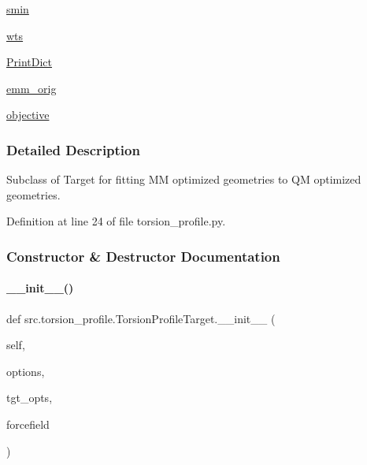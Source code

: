 \begin{DoxyCompactItemize}
\hyperlink{classsrc_1_1torsion__profile_1_1TorsionProfileTarget_a68645067dfaf9262844abe68c4ecacb6}{smin}
\item 
\hyperlink{classsrc_1_1torsion__profile_1_1TorsionProfileTarget_a712ce3fdf7f20114d54f59d79d97ede0}{wts}
\item 
\hyperlink{classsrc_1_1torsion__profile_1_1TorsionProfileTarget_a6eebf646c6d67980aa8291fd931b4073}{Print\+Dict}
\item 
\hyperlink{classsrc_1_1torsion__profile_1_1TorsionProfileTarget_ac84137cb1ee745c8d8dfe2580ce807db}{emm\+\_\+orig}
\item 
\hyperlink{classsrc_1_1torsion__profile_1_1TorsionProfileTarget_ac56fa0cfbe0cec0ca98322a5f7abff2a}{objective}
\end{DoxyCompactItemize}


\subsubsection{Detailed Description}
Subclass of Target for fitting MM optimized geometries to QM optimized geometries. 



Definition at line 24 of file torsion\+\_\+profile.\+py.



\subsubsection{Constructor \& Destructor Documentation}
\mbox{\label{classsrc_1_1torsion__profile_1_1TorsionProfileTarget_a5b7676da29a7f8fb11b651155b1ba3bc}} 
\paragraph{\texorpdfstring{\+\_\+\+\_\+init\+\_\+\+\_\+()}{\_\_init\_\_()}}
{\footnotesize\ttfamily def src.\+torsion\+\_\+profile.\+Torsion\+Profile\+Target.\+\_\+\+\_\+init\+\_\+\+\_\+ (\begin{DoxyParamCaption}\item[{}]{self,  }\item[{}]{options,  }\item[{}]{tgt\+\_\+opts,  }\item[{}]{forcefield }\end{DoxyParamCaption})}




